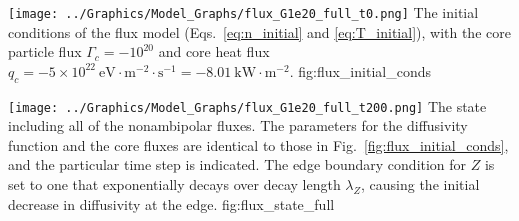 	{\texttt{[image: ../Graphics/Model\_Graphs/flux\_G1e20\_full\_t0.png]}}
	{The initial conditions of the flux model (Eqs.~\ref{eq:n_initial} and \ref{eq:T_initial}), with the core particle flux $\Gamma_c = -10^{20}$ and core heat flux $q_c = -5\times 10^{22}~\text{eV}\cdot\text{m}^{-2}\cdot\text{s}^{-1} = -8.01~\text{kW}\cdot\text{m}^{-2}$.}
	{fig:flux_initial_conds}

	{\texttt{[image: ../Graphics/Model\_Graphs/flux\_G1e20\_full\_t200.png]}}
	{The state including all of the nonambipolar fluxes.
	The parameters for the diffusivity function and the core fluxes are identical to those in Fig.~\ref{fig:flux_initial_conds}, and the particular time step is indicated.
	The edge boundary condition for $Z$ is set to one that exponentially decays over decay length $\lambda_Z$, causing the initial decrease in diffusivity at the edge.}
	{fig:flux_state_full}

